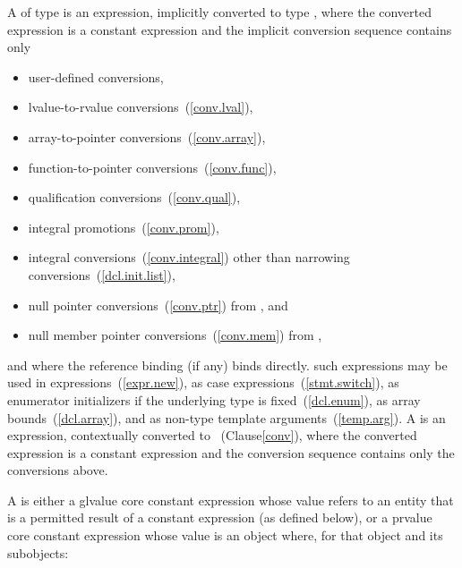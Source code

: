 \pnum
A  of type  is an
expression, implicitly converted to type , where
the converted expression is a constant expression and the
implicit conversion sequence contains only

\begin{itemize}
\item user-defined conversions,
\item lvalue-to-rvalue conversions~(\ref{conv.lval}),
\item array-to-pointer conversions~(\ref{conv.array}),
\item function-to-pointer conversions~(\ref{conv.func}),
\item qualification conversions~(\ref{conv.qual}),
\item integral promotions~(\ref{conv.prom}),
\item integral conversions~(\ref{conv.integral}) other than narrowing conversions~(\ref{dcl.init.list}),
\item null pointer conversions~(\ref{conv.ptr}) from , and
\item null member pointer conversions~(\ref{conv.mem}) from ,
\end{itemize}

and where the reference binding (if any) binds directly.
\enternote
such expressions may be used in 
expressions~(\ref{expr.new}), as case expressions~(\ref{stmt.switch}),
as enumerator initializers if the underlying type is
fixed~(\ref{dcl.enum}), as array bounds~(\ref{dcl.array}), and
as non-type template
arguments~(\ref{temp.arg}). 
\exitnote
{}%
%
A  is
an expression, contextually converted to ~(Clause\ref{conv}),
where the converted expression is a constant expression and
the conversion sequence contains only the conversions above.

\pnum
A  is either
a glvalue core constant expression whose value refers to
an entity that is a permitted result of a constant expression (as defined below), or
a prvalue core constant expression whose value is an object where, for that
object and its subobjects:

